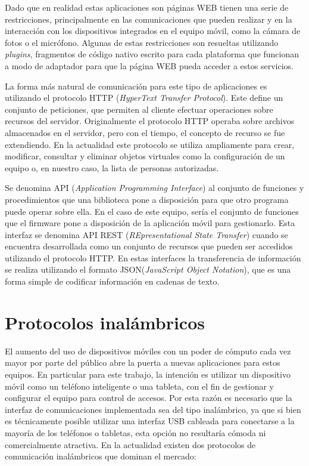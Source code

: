 Dado que en realidad estas aplicaciones son páginas WEB tienen una serie de restricciones, principalmente en las comunicaciones que pueden realizar y en la interacción con los dispositivos integrados en el equipo móvil, como la cámara de fotos o el micrófono. Algunas de estas restricciones son resueltas utilizando \emph{plugins}, fragmentos de código nativo escrito para cada plataforma que funcionan a modo de adaptador para que la página WEB pueda acceder a estos servicios.

La forma más natural de comunicación para este tipo de aplicaciones es utilizando el protocolo HTTP (\emph{HyperText Transfer Protocol}). Este define un conjunto de peticiones, que permiten al cliente efectuar operaciones sobre recursos del servidor. Originalmente el protocolo HTTP operaba sobre archivos almacenados en el servidor, pero con el tiempo, el concepto de recurso se fue extendiendo. En la actualidad este protocolo se utiliza ampliamente para crear, modificar, consultar y eliminar objetos virtuales como la configuración de un equipo o, en nuestro caso, la lista de personas autorizadas. 

Se denomina API (\emph{Application Programming Interface}) al conjunto de funciones y procedimientos que una biblioteca pone a disposición para que otro programa puede operar sobre ella. En el caso de este equipo, sería el conjunto de funciones que el firmware pone a disposición de la aplicación móvil para gestionarlo. Esta interfaz se denomina API REST (\emph{REpresentational State Transfer}) cuando se encuentra desarrollada como un conjunto de recursos que pueden ser accedidos utilizando el protocolo HTTP. En estas interfaces la transferencia de información se realiza utilizando el formato JSON(\emph{JavaScript Object Notation}), que es una forma simple de codificar información en cadenas de texto.

\section{Protocolos inalámbricos}

El aumento del uso de dispositivos móviles con un poder de cómputo cada vez mayor por parte del público abre la puerta a nuevas aplicaciones para estos equipos. En particular para este trabajo, la intención es utilizar un dispositivo móvil como un teléfono inteligente o una tableta, con el fin de gestionar y configurar el equipo para control de accesos. Por esta razón es necesario que la interfaz de comunicaciones implementada sea del tipo inalámbrico, ya que si bien es técnicamente posible utilizar una interfaz USB cableada para conectarse a la mayoría de los teléfonos o tabletas, esta opción no resultaría cómoda ni comercialmente atractiva. En la actualidad existen dos protocolos de comunicación inalámbricos que dominan el mercado:

